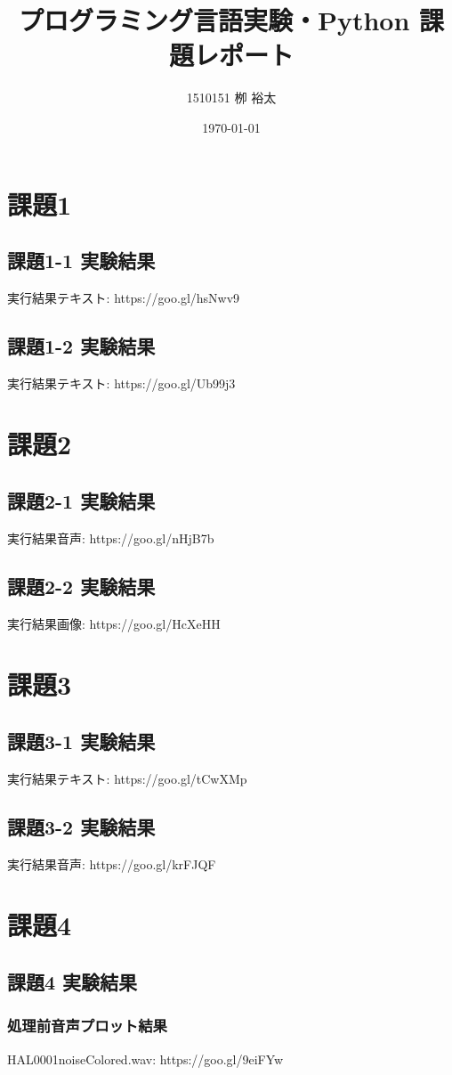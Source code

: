 \documentclass[11pt,a4paper, uplatex]{jsarticle}
\title{プログラミング言語実験・Python 課題レポート}
\author{1510151  栁 裕太}
\date{\today}
\begin{document}
\maketitle
\section{課題1}
\subsection{課題1-1 実験結果}
実行結果テキスト: https://goo.gl/hsNwv9
%
\subsection{課題1-2 実験結果}
実行結果テキスト: https://goo.gl/Ub99j3
%
\section{課題2}
\subsection{課題2-1 実験結果}
実行結果音声: https://goo.gl/nHjB7b
%
\subsection{課題2-2 実験結果}
実行結果画像: https://goo.gl/HcXeHH
%
\section{課題3}
\subsection{課題3-1 実験結果}
実行結果テキスト: https://goo.gl/tCwXMp
%
\subsection{課題3-2 実験結果}
実行結果音声: https://goo.gl/krFJQF

\section{課題4}
\subsection{課題4 実験結果}
\subsubsection{処理前音声プロット結果}
HAL0001noiseColored.wav: https://goo.gl/9eiFYw
\end{document}

